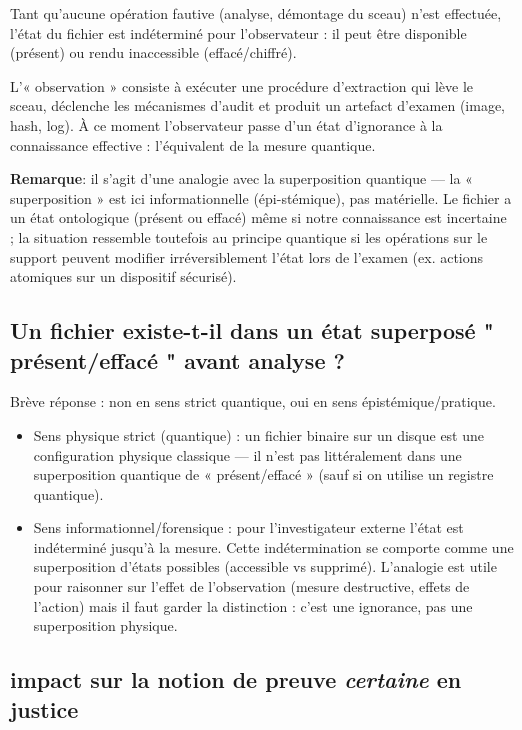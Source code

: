 \documentclass[12pt,a4paper]{article}
\begin{document}
	 Tant qu’aucune opération fautive (analyse, démontage du sceau) n’est effectuée, l’état du fichier est indéterminé pour l’observateur : il peut être disponible (présent) ou rendu inaccessible (effacé/chiffré).
	 
	 L’« observation » consiste à exécuter une procédure d’extraction qui lève le sceau, déclenche les mécanismes d’audit et produit un artefact d’examen (image, hash, log). À ce moment l’observateur passe d’un état d’ignorance à la connaissance effective : l’équivalent de la mesure quantique.

	 \textbf{Remarque}: il s’agit d’une analogie avec la superposition quantique — la « superposition » est ici informationnelle (épi-stémique), pas matérielle. Le fichier a un état ontologique (présent ou effacé) même si notre connaissance est incertaine ; la situation ressemble toutefois au principe quantique si les opérations sur le support peuvent modifier irréversiblement l’état lors de l’examen (ex. actions atomiques sur un dispositif sécurisé).
	 
	 \subsection{Un fichier existe-t-il dans un état superposé " présent/effacé " avant analyse ?}
	 Brève réponse : non en sens strict quantique, oui en sens épistémique/pratique.
	 \begin{itemize}
	 	\item	Sens physique strict (quantique) : un fichier binaire sur un disque est une configuration physique classique — il n’est pas littéralement dans une superposition quantique de « présent/effacé » (sauf si on utilise un registre quantique).
	 
	 \item Sens informationnel/forensique : pour l’investigateur externe l’état est indéterminé jusqu’à la mesure. Cette indétermination se comporte comme une superposition d’états possibles (accessible vs supprimé). L’analogie est utile pour raisonner sur l’effet de l’observation (mesure destructive, effets de l’action) mais il faut garder la distinction : c’est une ignorance, pas une superposition physique.
	\end{itemize}
	  
	 \subsection{impact sur la notion de preuve  \emph{certaine}  en justice}
	 
\end{document}
